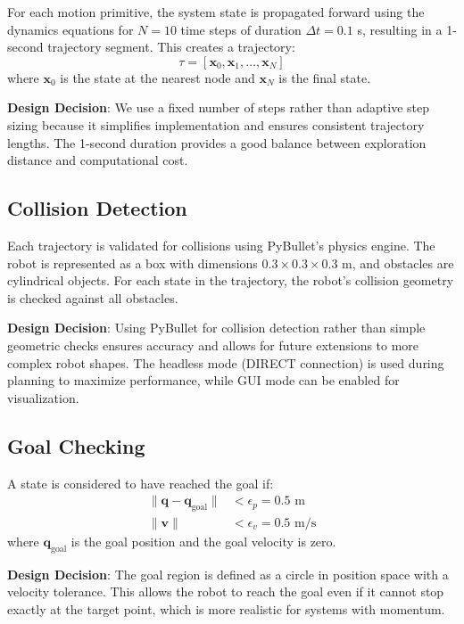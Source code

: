 \documentclass[11pt]{article}
\begin{document}
For each motion primitive, the system state is propagated forward using the dynamics equations for $N = 10$ time steps of duration $\Delta t = 0.1$ s, resulting in a 1-second trajectory segment. This creates a trajectory:
\begin{equation}
\tau = [\mathbf{x}_0, \mathbf{x}_1, \ldots, \mathbf{x}_N]
\end{equation}
where $\mathbf{x}_0$ is the state at the nearest node and $\mathbf{x}_N$ is the final state.

\textbf{Design Decision}: We use a fixed number of steps rather than adaptive step sizing because it simplifies implementation and ensures consistent trajectory lengths. The 1-second duration provides a good balance between exploration distance and computational cost.

\subsection{Collision Detection}

Each trajectory is validated for collisions using PyBullet's physics engine. The robot is represented as a box with dimensions $0.3 \times 0.3 \times 0.3$ m, and obstacles are cylindrical objects. For each state in the trajectory, the robot's collision geometry is checked against all obstacles.

\textbf{Design Decision}: Using PyBullet for collision detection rather than simple geometric checks ensures accuracy and allows for future extensions to more complex robot shapes. The headless mode (DIRECT connection) is used during planning to maximize performance, while GUI mode can be enabled for visualization.

\subsection{Goal Checking}

A state is considered to have reached the goal if:
\begin{align}
\|\mathbf{q} - \mathbf{q}_{\text{goal}}\| &< \epsilon_p = 0.5 \text{ m} \\
\|\mathbf{v}\| &< \epsilon_v = 0.5 \text{ m/s}
\end{align}
where $\mathbf{q}_{\text{goal}}$ is the goal position and the goal velocity is zero.

\textbf{Design Decision}: The goal region is defined as a circle in position space with a velocity tolerance. This allows the robot to reach the goal even if it cannot stop exactly at the target point, which is more realistic for systems with momentum.
\end{document}
